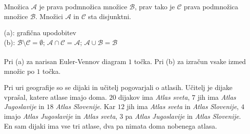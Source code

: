 \documentclass[addpoints]{exam}
\begin{document}
\begin{questions}
    \newpage
    \question
    Množica $\mathcal{A}$ je prava podmnožica množice $\mathcal{B}$, prav tako je $\mathcal{C}$ prava podmnožica množice $\mathcal{B}$. Množici $\mathcal{A}$ in $\mathcal{C}$ sta disjunktni.

    \begin{solution}[6cm]
        (a): grafična upodobitev \\
        (b): $\mathcal{B}\setminus\mathcal{C}=\emptyset$; $\mathcal{A}\cap\mathcal{C}=\mathcal{A}$; $\mathcal{A}\cup\mathcal{B}=\mathcal{B}$ \\ \\
        Pri (a) za narisan Euler-Vennov diagram $1$ točka. Pri (b) za izračun vsake izmed množic po $1$ točka.
    \end{solution}






    
    \question
    Pri uri geografije so se dijaki in učitelj pogovarjali o atlasih.  Učitelj je dijake vprašal, katere atlase imajo doma.
    $20$ dijakov ima \textit{Atlas sveta}, $7$ jih ima \textit{Atlas Jugoslavije} in $18$ \textit{Atlas Slovenije}. Kar $12$ jih ima \textit{Atlas sveta} in \textit{Atlas Slovenije}, $4$ imajo \textit{Atlas Jugoslavije} in \textit{Atlas sveta},
    $3$ pa \textit{Atlas Jugoslavije} in \textit{Atlas Slovenije}. En sam dijaki ima vse tri atlase, dva pa nimata doma nobenega atlasa. 
\end{questions}
\end{document}
